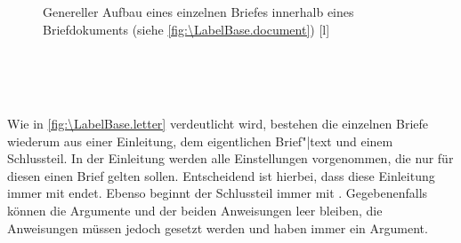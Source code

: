 \begin{figure}
  \setcapindent{0pt}%
  \begin{captionbeside}{Genereller Aufbau eines einzelnen Briefes
      innerhalb eines Briefdokuments (siehe
      \autoref{fig:\LabelBase.document})%
      \label{fig:\LabelBase.letter}}[l]
    \begin{minipage}[b]{.667\linewidth}%
      \centering\small\setlength{\fboxsep}{1.5ex}%
      \addtolength{\linewidth}{-\dimexpr2\fboxrule+2\fboxsep\relax}%
      \\[1pt]
      \\[1pt]
      \\[\dimexpr\fboxsep+\fboxrule\relax]
    \end{minipage}
  \end{captionbeside}
\end{figure}

Wie in \autoref{fig:\LabelBase.letter} verdeutlicht wird, bestehen die
einzelnen Briefe wiederum aus einer Einleitung, dem eigentlichen Brief"|text
und einem Schlussteil. In der Einleitung werden alle Einstellungen
vorgenommen, die nur für diesen einen Brief gelten sollen. Entscheidend ist
hierbei, dass diese Einleitung immer mit
 endet. Ebenso beginnt der
Schlussteil immer mit
. Gegebenenfalls können die
Argumente  und  der beiden Anweisungen leer
bleiben, die Anweisungen müssen jedoch gesetzt werden und haben immer ein
Argument.

